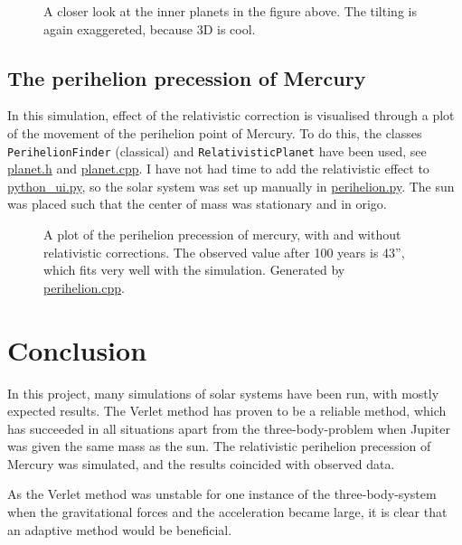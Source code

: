 \documentclass[12pt,english,a4paper]{article}
\newcommand{\program}[1]{\href{https://github.com/anjohan/Offentlig/blob/master/FYS3150/Oblig3/#1}{#1}}
\begin{document}
\begin{figure}[H]
\centering

\caption{A closer look at the inner planets in the figure above. The tilting is again exaggereted, because 3D is cool.}
\end{figure}

\subsection{The perihelion precession of Mercury}
In this simulation, effect of the relativistic correction is visualised through a plot of the movement of the perihelion point of Mercury. To do this, the classes \texttt{PerihelionFinder} (classical) and \texttt{RelativisticPlanet} have been used, see \program{planet.h} and \program{planet.cpp}. I have not had time to add the relativistic effect to \program{python\_ui.py}, so the solar system was set up manually in \program{perihelion.py}. The sun was placed such that the center of mass was stationary and in origo.
\begin{figure}[H]
\centering

\caption{A plot of the perihelion precession of mercury, with and without relativistic corrections. The observed value after 100 years is 43'', which fits very well with the simulation. Generated by \program{perihelion.cpp}.}
\end{figure}

\section{Conclusion}
In this project, many simulations of solar systems have been run, with mostly expected results. The Verlet method has proven to be a reliable method, which has succeeded in all situations apart from the three-body-problem when Jupiter was given the same mass as the sun. The relativistic perihelion precession of Mercury was simulated, and the results coincided with observed data.

As the Verlet method was unstable for one instance of the three-body-system when the gravitational forces and the acceleration became large, it is clear that an adaptive method would be beneficial.

\clearpage
{}
\printbibliography
\end{document}
